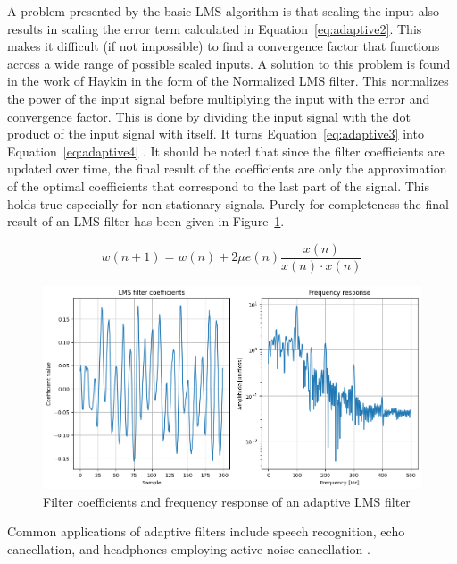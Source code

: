 A problem presented by the basic LMS algorithm is that scaling the input also results in scaling the error term calculated in Equation~\ref{eq:adaptive2}. This makes it difficult (if not impossible) to find a convergence factor that functions across a wide range of possible scaled inputs. A solution to this problem is found in the work of Haykin \cite{adaptive_filter_theory} in the form of the Normalized LMS filter. This normalizes the power of the input signal before multiplying the input with the error and convergence factor. This is done by dividing the input signal with the  dot product of the input signal with itself. It turns Equation~\ref{eq:adaptive3} into Equation~\ref{eq:adaptive4} \cite{adaptive_filter_theory}. It should be noted that since the filter coefficients are updated over time, the final result of the coefficients are only the approximation of the optimal coefficients that correspond to the last part of the signal. This holds true especially for non-stationary signals. Purely for completeness the final result of an LMS filter has been given in Figure~\ref{fig:lms_filter_response}.

\begin{equation}\label{eq:adaptive4}
    w(n+1) = w(n) + 2 \mu e(n)  \frac{x(n)}{x(n) \cdot x(n)}
\end{equation}

\begin{figure}[h!t]
	\begin{center}
		\includegraphics[width=1.0\columnwidth]{images/lms_filter_response.png}
	\end{center}
	\caption{Filter coefficients and frequency response of an adaptive LMS filter}
	\label{fig:lms_filter_response}
\end{figure}

Common applications of adaptive filters include speech recognition, echo cancellation, and headphones employing active noise cancellation \cite{active_noise_cancellation_wiener_filter,wiener_vs_adaptive_realtime_noisecancellation}.

